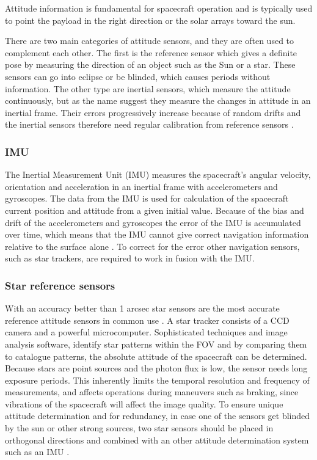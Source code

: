 Attitude information is fundamental for spacecraft operation and is typically used to point the payload in the right direction or the solar arrays toward the sun. 

There are two main categories of attitude sensors, and they are often used to complement each
other. The first is the reference sensor which gives a definite pose by measuring the direction of an object
such as the Sun or a star. These sensors can go into eclipse or be blinded, which causes periods without information. The other type are inertial sensors, which measure the attitude continuously, but as the name suggest they measure the changes in attitude in an inertial frame. Their errors progressively increase because of random drifts and the inertial sensors therefore need regular calibration from reference sensors \cite{spacecraft}.

\subsubsection{IMU}
The Inertial Measurement Unit (IMU) measures the spacecraft's angular velocity, orientation and acceleration in an inertial frame with accelerometers and gyroscopes. The data from the IMU is used for calculation of the spacecraft current position and attitude from a given initial value. Because of the bias and drift of the accelerometers and gyroscopes the error of the IMU is accumulated over time, which means that the IMU cannot give correct navigation information relative to the surface alone \cite{IMUcamb}.
To correct for the error other navigation sensors, such as star trackers, are required to work in fusion with the IMU. 



\subsubsection{Star reference sensors}
With an accuracy better than 1 arcsec star sensors are the most accurate reference attitude sensors in common use \cite{spacecraft}. A star tracker consists of a CCD camera and a powerful microcomputer. Sophisticated techniques and image analysis software, identify star patterns within the FOV and by comparing them to catalogue patterns, the absolute attitude of the spacecraft can be determined. Because stars are point sources and the photon flux is low, the sensor needs long exposure periods. This inherently limits the temporal resolution and frequency of measurements, and affects operations during maneuvers such as braking, since vibrations of the spacecraft will affect the image quality. To ensure unique attitude determination and for redundancy, in case one of the sensors get blinded by the sun or other strong sources, two star sensors should be placed in orthogonal directions and combined with an other attitude determination system such as an IMU \cite{alessandro}.

